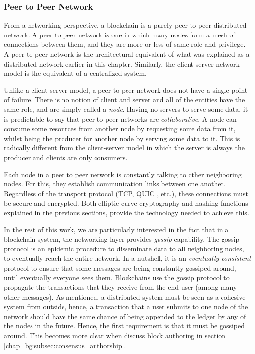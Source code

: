 \subsubsection{Peer to Peer Network} \label{chap_bg:subsec:p2p}

From a networking perspective, a blockchain is a purely peer to peer distributed network. A peer to
peer network is one in which many nodes form a mesh of connections between them, and they are more
or less of same role and privilege. A peer to peer network is the architectural equivalent of what
was explained as a distributed network earlier in this chapter. Similarly, the client-server network
model is the equivalent of a centralized system.

Unlike a client-server model, a peer to peer network does not have a single point of failure. There
is no notion of client and server and all of the entities have the same role, and are simply called
a \textit{node}. Having no servers to serve some data, it is predictable to say that peer to peer
networks are \textit{collaborative}. A node can consume some resources from another node by
requesting some data from it, whilst being the producer for another node by serving some data to it.
This is radically different from the client-server model in which the server is always the producer
and clients are only consumers.

Each node in a peer to peer network is constantly talking to other neighboring nodes. For this, they
establish communication links between one another. Regardless of the transport protocol (TCP, QUIC
\cite{quic}, etc.), these connections must be secure and encrypted. Both elliptic curve cryptography
and hashing functions explained in the previous sections, provide the technology needed to achieve
this.

In the rest of this work, we are particularly interested in the fact that in a blockchain system,
the networking layer provides \textit{gossip} capability. The gossip protocol is an epidemic
procedure to disseminate data to all neighboring nodes, to eventually reach the entire network. In a
nutshell, it is an \textit{eventually consistent} protocol to ensure that some messages are being
constantly gossiped around, until eventually everyone sees them. Blockchains use the gossip protocol
to propagate the transactions that they receive from the end user (among many other messages). As
mentioned, a distributed system must be seen as a cohesive system from outside, hence, a transaction
that a user submits to one node of the network should have the same chance of being appended to the
ledger by any of the nodes in the future. Hence, the first requirement is that it must be gossiped
around. This becomes more clear when discuss block authoring in section
\ref{chap_bg:subsec:consensus_authorship}.

